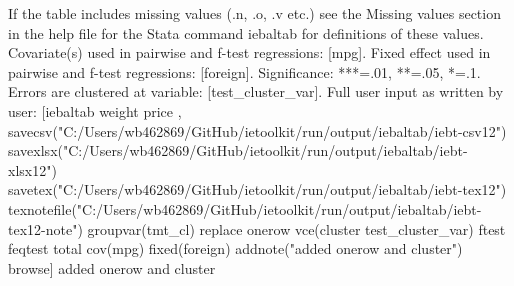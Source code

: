 If the table includes missing values (.n, .o, .v etc.) see the Missing values section in the help file for the Stata command iebaltab for definitions of these values. Covariate(s) used in pairwise and f-test regressions: [mpg]. Fixed effect used in pairwise and f-test regressions: [foreign]. Significance: ***=.01, **=.05, *=.1. Errors are clustered at variable: [test\_cluster\_var]. Full user input as written by user: [iebaltab weight price , savecsv("C:/Users/wb462869/GitHub/ietoolkit/run/output/iebaltab/iebt-csv12") savexlsx("C:/Users/wb462869/GitHub/ietoolkit/run/output/iebaltab/iebt-xlsx12") savetex("C:/Users/wb462869/GitHub/ietoolkit/run/output/iebaltab/iebt-tex12") texnotefile("C:/Users/wb462869/GitHub/ietoolkit/run/output/iebaltab/iebt-tex12-note") groupvar(tmt\_cl) replace onerow vce(cluster test\_cluster\_var) ftest feqtest total cov(mpg) fixed(foreign) addnote("added onerow and cluster") browse] added onerow and cluster
